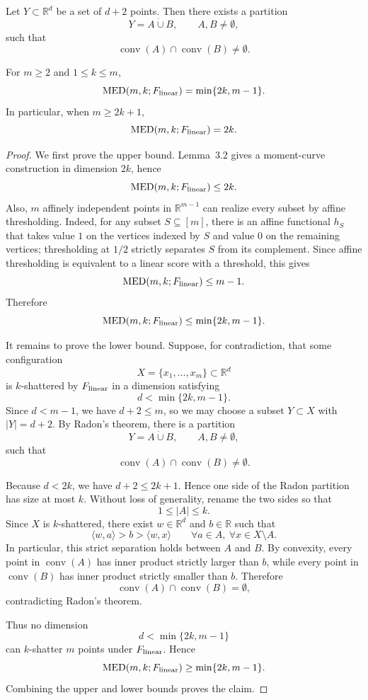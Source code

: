 \documentclass{article}
\begin{document}
\begin{theorem}
\label{thm:radon}
Let \(Y\subset \mathbb R^d\) be a set of \(d+2\) points. Then there
exists a partition
\[
    Y=A\dot\cup B,
    \qquad A,B\neq \emptyset,
\]
such that
\[
    \operatorname{conv}(A)\cap \operatorname{conv}(B)\neq \emptyset .
\]
\end{theorem}

\begin{proposition}
\label{prop:radon-linear-med}
For \(m\ge 2\) and \(1\le k\le m\),
\[
    \mathrm{MED}(m,k;F_{\rm linear})
    =
    \min\{2k,m-1\}.
\]
In particular, when \(m\ge 2k+1\),
\[
    \mathrm{MED}(m,k;F_{\rm linear})=2k.
\]
\end{proposition}

\begin{proof}
We first prove the upper bound. Lemma~3.2 gives a moment-curve
construction in dimension \(2k\), hence
\[
    \mathrm{MED}(m,k;F_{\rm linear})\le 2k .
\]
Also, \(m\) affinely independent points in \(\mathbb R^{m-1}\) can
realize every subset by affine thresholding. Indeed, for any subset
\(S\subseteq [m]\), there is an affine functional \(h_S\) that takes
value \(1\) on the vertices indexed by \(S\) and value \(0\) on the
remaining vertices; thresholding at \(1/2\) strictly separates \(S\)
from its complement. Since affine thresholding is equivalent to a
linear score with a threshold, this gives
\[
    \mathrm{MED}(m,k;F_{\rm linear})\le m-1 .
\]
Therefore
\[
    \mathrm{MED}(m,k;F_{\rm linear})
    \le
    \min\{2k,m-1\}.
\]

It remains to prove the lower bound. Suppose, for contradiction, that
some configuration
\[
    X=\{x_1,\ldots,x_m\}\subset \mathbb R^d
\]
is \(k\)-shattered by \(F_{\rm linear}\) in a dimension satisfying
\[
    d < \min\{2k,m-1\}.
\]
Since \(d<m-1\), we have \(d+2\le m\), so we may choose a subset
\(Y\subset X\) with \(|Y|=d+2\). By Radon's theorem, there is a
partition
\[
    Y=A\dot\cup B,
    \qquad A,B\neq \emptyset,
\]
such that
\[
    \operatorname{conv}(A)\cap \operatorname{conv}(B)\neq \emptyset .
\]

Because \(d<2k\), we have \(d+2\le 2k+1\). Hence one side of the
Radon partition has size at most \(k\). Without loss of generality,
rename the two sides so that
\[
    1\le |A|\le k .
\]
Since \(X\) is \(k\)-shattered, there exist \(w\in\mathbb R^d\) and
\(b\in\mathbb R\) such that
\[
    \langle w,a\rangle > b > \langle w,x\rangle
    \qquad
    \forall a\in A,\ \forall x\in X\setminus A .
\]
In particular, this strict separation holds between \(A\) and \(B\).
By convexity, every point in \(\operatorname{conv}(A)\) has inner
product strictly larger than \(b\), while every point in
\(\operatorname{conv}(B)\) has inner product strictly smaller than
\(b\). Therefore
\[
    \operatorname{conv}(A)\cap \operatorname{conv}(B)=\emptyset,
\]
contradicting Radon's theorem.

Thus no dimension
\[
    d<\min\{2k,m-1\}
\]
can \(k\)-shatter \(m\) points under \(F_{\rm linear}\). Hence
\[
    \mathrm{MED}(m,k;F_{\rm linear})
    \ge
    \min\{2k,m-1\}.
\]
Combining the upper and lower bounds proves the claim.
\end{proof}
\end{document}
